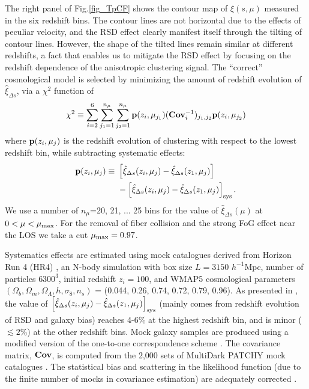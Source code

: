 \documentclass[iop]{emulateapj}
\begin{document}
The right panel of Fig.\ref{fig_TpCF} shows the contour map of $\xi(s,\mu)$ measured in the six redshift bins.
The contour lines are not horizontal due to the effects of peculiar velocity,
and the RSD effect clearly manifest itself through the tilting of contour lines.
However, the shape of the tilted lines remain similar at different redshifts, a fact that enables us  to mitigate the RSD effect by focusing on the redshift dependence of the anisotropic clustering signal.
The ``correct'' cosmological model is selected by minimizing the amount of redshift evolution of $\hat\xi_{\Delta s}$,
via a $\chi^2$ function of 
\begin{equation}
 \chi^2\equiv \sum_{i=2}^{6} \sum_{j_1=1}^{n_{\mu}} \sum_{j_2=1}^{n_{\mu}} {\bf p}(z_i,\mu_{j_1}) ({\bf Cov}_{i}^{-1})_{j_1,j_2}  {\bf p}(z_i,\mu_{j_2})
\end{equation}
where ${\bf p}(z_i,\mu_{j})$ is the redshift evolution of clustering with respect to the lowest redshift bin,
while subtracting systematic effects:
\begin{eqnarray}
 {\bf p}(z_i,\mu_{j}) \equiv\ & \left[\hat\xi_{\Delta s}(z_i,\mu_j)-\hat\xi_{\Delta s}(z_1,\mu_j)\right] \\ \nonumber
 &- \left[\hat\xi_{\Delta s}(z_i,\mu_j)-\hat\xi_{\Delta s}(z_1,\mu_j)\right]_{\rm sys}.
\end{eqnarray}
We use a number of $n_{\mu}$=20, 21, ... 25 bins for the value of $\hat\xi_{\Delta s}(\mu)$ at $0<\mu<\mu_{\rm max}$.
For the removal of fiber collision and the strong FoG effect near the LOS we take a cut $\mu_{\rm max} = 0.97$.

Systematics effects are estimated using mock catalogues derived from Horizon Run 4 (HR4) \cite{HR4},
an N-body simulation with box size $L={3150}$ $h^{-1}$Mpc, number of particles $6300^3$,   
initial redshift $z_{i}=100$, and WMAP5\citep{komatsu2011} cosmological parameters 
$(\Omega_{b},\Omega_{m},\Omega_\Lambda,h,\sigma_8,n_s)$  = (0.044, 0.26, 0.74, 0.72, 0.79, 0.96). 
As presented in \cite{Li2016}, the value of $\left[\hat\xi_{\Delta s}(z_i,\mu_j)-\hat\xi_{\Delta s}(z_1,\mu_j)\right]_{\rm sys}$
(mainly comes from redshift evolution of RSD and galaxy bias)
reaches 4-6\% at the highest redshift bin,
and is minor ($\lesssim2\%$) at the other redshift bins.
Mock galaxy samples are produced using a modified version of the one-to-one correspondence scheme \citep{hong2016}. 
The covariance matrix, ${\bf Cov}$, is computed from the 2,000 sets of MultiDark PATCHY mock catalogues \citep{MDPATCHY}.
The statistical bias and scattering in the likelihood function (due to the finite number of mocks in covariance estimation) 
are adequately corrected \citep{Hartlap,Percival2014}.
\end{document}
